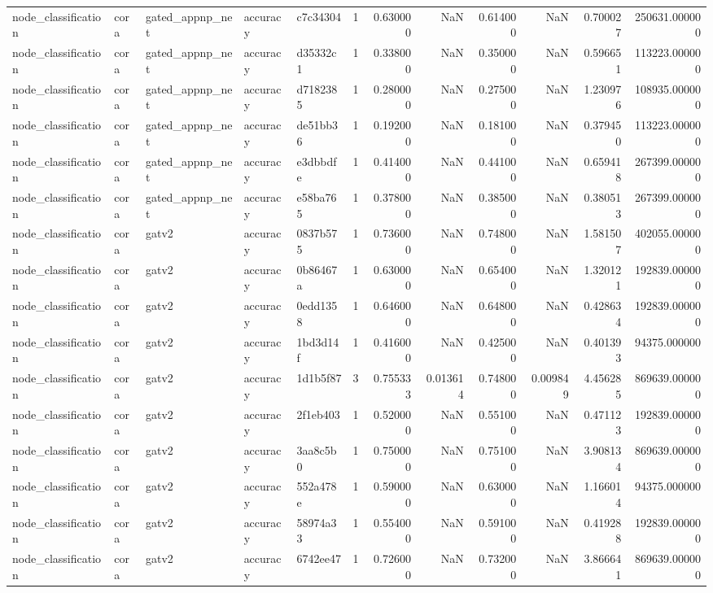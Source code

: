 \begin{tabular}{lllllrrrrrrr}
node_classification & cora & gated_appnp_net & accuracy & c7c34304 & 1 & 0.630000 & NaN & 0.614000 & NaN & 0.700027 & 250631.000000 \\
node_classification & cora & gated_appnp_net & accuracy & d35332c1 & 1 & 0.338000 & NaN & 0.350000 & NaN & 0.596651 & 113223.000000 \\
node_classification & cora & gated_appnp_net & accuracy & d7182385 & 1 & 0.280000 & NaN & 0.275000 & NaN & 1.230976 & 108935.000000 \\
node_classification & cora & gated_appnp_net & accuracy & de51bb36 & 1 & 0.192000 & NaN & 0.181000 & NaN & 0.379450 & 113223.000000 \\
node_classification & cora & gated_appnp_net & accuracy & e3dbbdfe & 1 & 0.414000 & NaN & 0.441000 & NaN & 0.659418 & 267399.000000 \\
node_classification & cora & gated_appnp_net & accuracy & e58ba765 & 1 & 0.378000 & NaN & 0.385000 & NaN & 0.380513 & 267399.000000 \\
node_classification & cora & gatv2 & accuracy & 0837b575 & 1 & 0.736000 & NaN & 0.748000 & NaN & 1.581507 & 402055.000000 \\
node_classification & cora & gatv2 & accuracy & 0b86467a & 1 & 0.630000 & NaN & 0.654000 & NaN & 1.320121 & 192839.000000 \\
node_classification & cora & gatv2 & accuracy & 0edd1358 & 1 & 0.646000 & NaN & 0.648000 & NaN & 0.428634 & 192839.000000 \\
node_classification & cora & gatv2 & accuracy & 1bd3d14f & 1 & 0.416000 & NaN & 0.425000 & NaN & 0.401393 & 94375.000000 \\
node_classification & cora & gatv2 & accuracy & 1d1b5f87 & 3 & 0.755333 & 0.013614 & 0.748000 & 0.009849 & 4.456285 & 869639.000000 \\
node_classification & cora & gatv2 & accuracy & 2f1eb403 & 1 & 0.520000 & NaN & 0.551000 & NaN & 0.471123 & 192839.000000 \\
node_classification & cora & gatv2 & accuracy & 3aa8c5b0 & 1 & 0.750000 & NaN & 0.751000 & NaN & 3.908134 & 869639.000000 \\
node_classification & cora & gatv2 & accuracy & 552a478e & 1 & 0.590000 & NaN & 0.630000 & NaN & 1.166014 & 94375.000000 \\
node_classification & cora & gatv2 & accuracy & 58974a33 & 1 & 0.554000 & NaN & 0.591000 & NaN & 0.419288 & 192839.000000 \\
node_classification & cora & gatv2 & accuracy & 6742ee47 & 1 & 0.726000 & NaN & 0.732000 & NaN & 3.866641 & 869639.000000 \\

\end{tabular}
